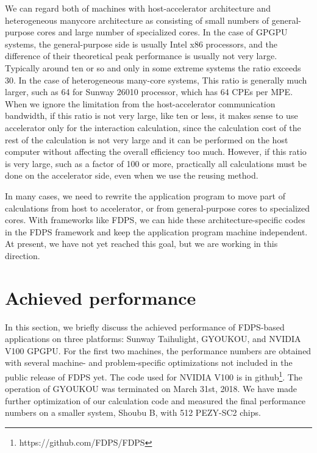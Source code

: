 We can regard both of  machines with host-accelerator architecture and
heterogeneous manycore architecture as consisting of small numbers of
general-purpose cores and large number of specialized cores. In the
case of GPGPU systems, the general-purpose side is usually Intel x86
processors, and the difference of their theoretical peak performance
is usually not very large. Typically around ten or so and only in  some
extreme systems the ratio exceeds 30.  In the case of heterogeneous
many-core systems, This  ratio is generally much larger, such as 64
for Sunway 26010 processor, which has 64 CPEs per  MPE. 
When we ignore the limitation from the host-accelerator communication
bandwidth, if this ratio is not very large, like ten or less, it makes
sense to use accelerator only for the interaction calculation, since
the calculation cost of the rest of the calculation is not very large
and it can be performed on the host computer without affecting the
overall efficiency too much. However, if this ratio is very large,
such as a factor of 100 or more, practically all calculations must be
done on the accelerator side, even when we use the reusing method.

In many cases, we need to rewrite the application program to move part
of calculations from host to accelerator, or from general-purpose
cores to specialized cores.  With frameworks like FDPS, we can hide
these architecture-specific codes in the FDPS framework and keep the
application program machine independent. At present, we have not yet
reached this goal, but we are working in this direction.


\section{Achieved performance}
\label{sec:performance}

In this section, we briefly discuss the achieved performance of
FDPS-based applications on three platforms: Sunway Taihulight,
GYOUKOU, and NVIDIA V100 GPGPU. For the first two machines,
the performance numbers are obtained with several machine- and
problem-specific optimizations not included in the public release of
FDPS yet. The code used for NVIDIA V100 is in
github\footnote{https://github.com/FDPS/FDPS}.
The operation of GYOUKOU was terminated on March 31st, 2018. We have
made further optimization of our calculation code and measured the
final performance numbers on a smaller system, Shoubu B, with 512
PEZY-SC2 chips.



